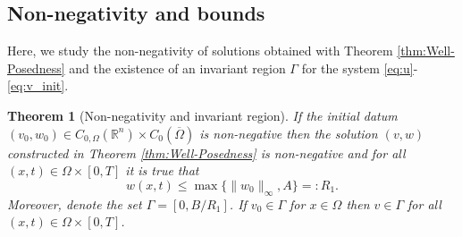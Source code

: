 \documentclass[11pt, a4paper]{article}
\theoremstyle{break}
\newtheorem{thm}{Theorem}[section]
\theoremstyle{break}
\theoremstyle{break}
\theoremstyle{break}
\theoremstyle{break}
\theoremstyle{break}
\theoremstyle{break}
\begin{document}
\subsection{Non-negativity and bounds} 
Here, we study the non-negativity of solutions obtained with Theorem \ref{thm:Well-Posedness} and the existence of an invariant region $\Gamma$ for the system \eqref{eq:u}-\eqref{eq:v_init}.
\begin{thm}[Non-negativity and invariant region]
    \label{thm:Non-negativity}
     If the initial datum $(v_0, w_0) \in C_{0, \Omega}(\mathbb{R}^n) \times C_0(\overline{\Omega})$ is non-negative then the solution $(v, w)$ constructed in Theorem \ref{thm:Well-Posedness} is non-negative and for all $(x, t) \in \Omega \times [0, T]$ it is true that
     \begin{equation}
         w(x,t) \leq \max\{\|w_0\|_\infty, A\} =: R_1.
     \end{equation}
     Moreover, denote the set $\Gamma = [0, B/R_1]$. If $v_0 \in \Gamma$ for $x \in \Omega$ then $v \in \Gamma$ for all $(x, t) \in \Omega \times [0, T]$.
\end{thm}
\end{document}
